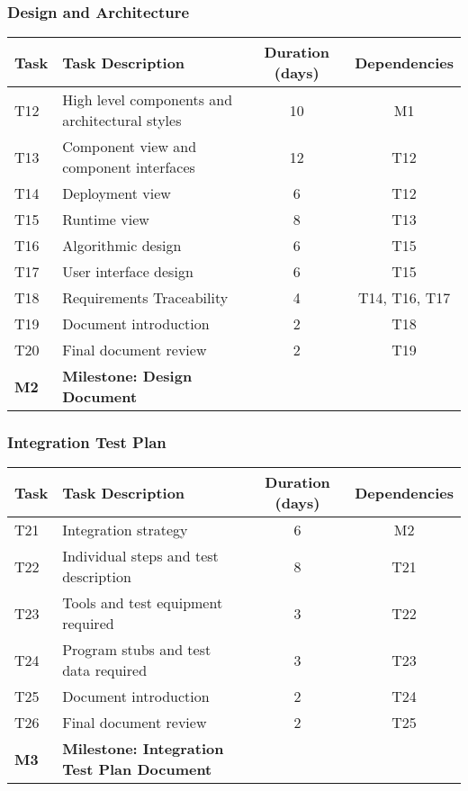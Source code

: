 \subsubsection{Design and Architecture}
\begin{tabular}{| l | p{7cm}  | c |  c |}
\hline
\textbf{Task} & \textbf{Task Description} & \textbf{Duration (days)} & \textbf{Dependencies}\\
\hline
T12 & High level components and architectural styles & 10 & M1\\
\hline
T13 & Component view and component interfaces & 12 & T12\\
\hline
T14 & Deployment view & 6 & T12\\
\hline
T15 & Runtime view & 8 & T13\\
\hline
T16 & Algorithmic design & 6 & T15\\
\hline
T17 & User interface design & 6 & T15\\
\hline
T18 & Requirements Traceability & 4 & T14, T16, T17\\
\hline
T19 & Document introduction & 2 & T18\\
\hline
T20 & Final document review & 2 & T19\\
\hline
\textbf{M2} & \textbf{Milestone: Design Document} &  & \\
\hline
\end{tabular}

\subsubsection{Integration Test Plan}
\begin{tabular}{| l | p{7cm}  | c |  c |}
\hline
\textbf{Task} & \textbf{Task Description} & \textbf{Duration (days)} & \textbf{Dependencies}\\
\hline
T21 & Integration strategy & 6 & M2\\
\hline
T22 & Individual steps and test description & 8 & T21\\
\hline
T23 & Tools and test equipment required & 3 & T22\\
\hline
T24 & Program stubs and test data required & 3 & T23\\
\hline
T25 & Document introduction & 2 & T24\\
\hline
T26 & Final document review & 2 & T25\\
\hline
\textbf{M3} & \textbf{Milestone: Integration Test Plan Document} &  & \\
\hline
\end{tabular}

